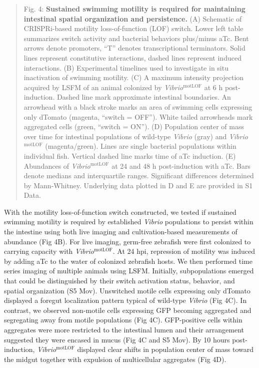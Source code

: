 \begin{quote}
Fig. 4: \textbf{Sustained swimming motility is required for maintaining intestinal spatial organization and persistence.} (A) Schematic of CRISPRi-based motility loss-of-function (LOF) switch. Lower left table summarizes switch activity and bacterial behaviors plus/minus aTc. Bent arrows denote promoters, ``T'' denotes transcriptional terminators. Solid lines represent constitutive interactions, dashed lines represent induced interactions. (B) Experimental timelines used to investigate in situ inactivation of swimming motility. (C) A maximum intensity projection acquired by LSFM of an animal colonized by \textit{Vibrio}$^{\text{motLOF}}$ at 6 h post-induction. Dashed line mark approximate intestinal boundaries. An arrowhead with a black stroke marks an area of swimming cells expressing only dTomato (magenta, ``switch = OFF''). White tailed arrowheads mark aggregated cells (green, ``switch = ON''). (D) Population center of mass over time for intestinal populations of wild-type \textit{Vibrio} (gray) and \textit{Vibrio}$^{\text{motLOF}}$ (magenta/green). Lines are single bacterial populations within individual fish. Vertical dashed line marks time of aTc induction. (E) Abundances of \textit{Vibrio}$^{\text{motLOF}}$ at 24 and 48 h post-induction with aTc. Bars denote medians and interquartile ranges. Significant differences determined by Mann-Whitney. Underlying data plotted in D and E are provided in S1 Data.
\end{quote}

With the motility loss-of-function switch constructed, we tested if sustained swimming motility is required by established \textit{Vibrio} populations to persist within the intestine using both live imaging and cultivation-based measurements of abundance (Fig 4B). For live imaging, germ-free zebrafish were first colonized to carrying capacity with \textit{Vibrio}$^{\text{motLOF}}$. At 24 hpi, repression of motility was induced by adding aTc to the water of colonized zebrafish hosts. We then performed time series imaging of multiple animals using LSFM. Initially, subpopulations emerged that could be distinguished by their switch activation status, behavior, and spatial organization (S5 Mov). Unswitched motile cells expressing only dTomato displayed a foregut localization pattern typical of wild-type \textit{Vibrio} (Fig 4C). In contrast, we observed non-motile cells expressing GFP becoming aggregated and segregating away from motile populations (Fig 4C). GFP-positive cells within aggregates were more restricted to the intestinal lumen and their arrangement suggested they were encased in mucus (Fig 4C and S5 Mov). By 10 hours post-induction, \textit{Vibrio}$^{\text{motLOF}}$ displayed clear shifts in population center of mass toward the midgut together with expulsion of multicellular aggregates (Fig 4D).

